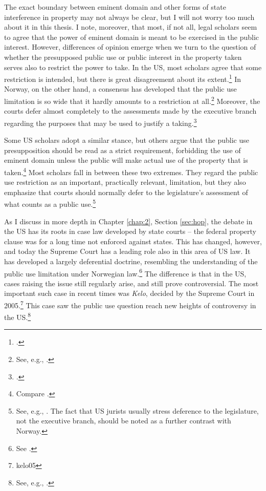 \documentclass[12pt,a4paper]{book} %
\begin{document}
The exact boundary between eminent domain and other forms of state interference in property may not always be clear, but I will not worry too much about it in this thesis. I note, moreover, that most, if not all, legal scholars seem to agree that the power of eminent domain is meant to be exercised in the public interest. However, differences of opinion emerge when we turn to the question of whether the presupposed public use or public interest in the property taken serves also to restrict the power to take. In the US, most scholars agree that some restriction is intended, but there is great disagreement about its extent.\footcite[205]{berger78} In Norway, on the other hand, a consensus has developed that the public use limitation is so wide that it hardly amounts to a restriction at all.\footnote{See, e.g., \cite[368]{aall10}.} Moreover, the courts defer almost completely to the assessments made by the executive branch regarding the purposes that may be used to justify a taking.\footcite[368]{aall10}

Some US scholars adopt a similar stance, but others argue that the public use presupposition should be read as a strict requirement, forbidding the use of eminent domain unless the public will make actual use of the property that is taken.\footnote{Compare \cite{bell06,bell09,claeys04,sandefur06}.} Most scholars fall in between these two extremes. They regard the public use restriction as an important, practically relevant, limitation, but they also emphasize that courts should normally defer to the legislature's assessment of what counts as a public use.\footnote{See, e.g., \cite{merrill86,alexander05}. The fact that US jurists usually stress deference to the legislature, not the executive branch, should be noted as a further contrast with Norway.}

As I discuss in more depth in Chapter \ref{chap:2}, Section \ref{sec:hop}, the debate in the US has its roots in case law developed by state courts -- the federal property clause was for a long time not enforced against states. This has changed, however, and today the Supreme Court has a leading role also in this area of US law. It has developed a largely deferential doctrine, resembling the understanding of the public use limitation under Norwegian law.\footnote{See \cite{berman54,midkiff84,kelo05}.} The difference is that in the US, cases raising the issue  still regularly arise, and still prove controversial. The most important such case in recent times was {\it Kelo}, decided by the Supreme Court in 2005.\footnote{kelo05} This case saw the public use question reach new heights of controversy in the US.\footnote{See, e.g., \cite{somin09}.}
\end{document}

